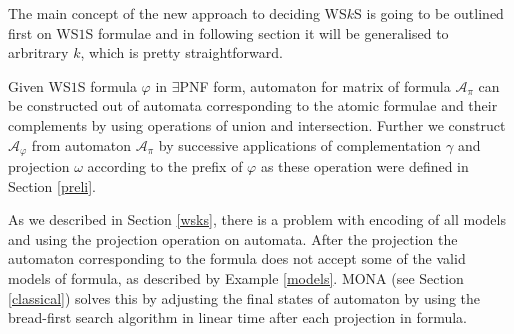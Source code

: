 The main concept of the new approach to deciding WS$k$S is going to be
outlined first on WS$1$S formulae and in following section it will be
generalised to arbritrary $k$, which is pretty straightforward.

Given WS$1$S formula $\varphi$ in $\exists$PNF form, automaton for matrix of
formula $\mathcal{A}_\pi$ can be constructed out of automata corresponding to
the atomic formulae and their complements by using operations of union and
intersection. Further we construct $\mathcal{A}_\varphi$ from automaton
$\mathcal{A}_\pi$ by successive applications of complementation $\gamma$ and
projection $\omega$ according to the prefix of $\varphi$ as these
operation were defined in Section \ref{preli}.

As we described in Section \ref{wsks}, there is a problem with encoding of all
models and using the projection operation on automata. After the projection the
automaton corresponding to the formula does not accept some of the valid models
of formula, as described by Example \ref{models}. \textsc{MONA} (see Section
\ref{classical}) solves this by adjusting the final states of automaton by using
the bread-first search algorithm in linear time after each projection in
formula.

